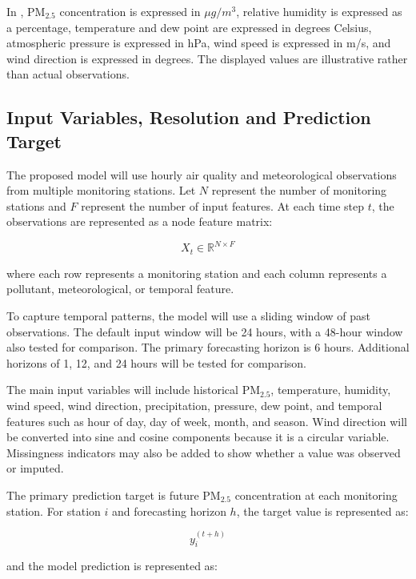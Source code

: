 In , PM$_{2.5}$ concentration is expressed in $\mu g/m^3$, relative humidity is expressed as a percentage, temperature and dew point are expressed in degrees Celsius, atmospheric pressure is expressed in hPa, wind speed is expressed in m/s, and wind direction is expressed in degrees. The displayed values are illustrative rather than actual observations.

\subsection{Input Variables, Resolution and Prediction Target}

The proposed model will use hourly air quality and meteorological observations from multiple monitoring stations. Let $N$ represent the number of monitoring stations and $F$ represent the number of input features. At each time step $t$, the observations are represented as a node feature matrix:

\begin{equation}
X_t \in \mathbb{R}^{N \times F}
\end{equation}

where each row represents a monitoring station and each column represents a pollutant, meteorological, or temporal feature.

To capture temporal patterns, the model will use a sliding window of past observations. The default input window will be 24 hours, with a 48-hour window also tested for comparison. The primary forecasting horizon is 6 hours. Additional horizons of 1, 12, and 24 hours will be tested for comparison.

The main input variables will include historical PM$_{2.5}$, temperature, humidity, wind speed, wind direction, precipitation, pressure, dew point, and temporal features such as hour of day, day of week, month, and season. Wind direction will be converted into sine and cosine components because it is a circular variable. Missingness indicators may also be added to show whether a value was observed or imputed.

The primary prediction target is future PM$_{2.5}$ concentration at each monitoring station. For station $i$ and forecasting horizon $h$, the target value is represented as:

\begin{equation}
y_i^{(t+h)}
\end{equation}

and the model prediction is represented as:

